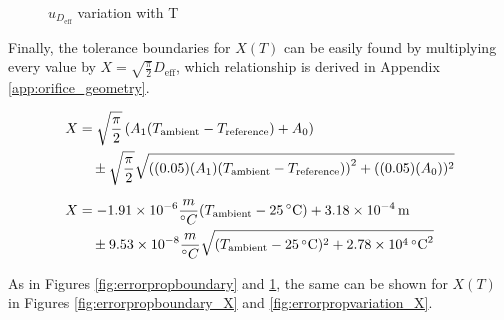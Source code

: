 \documentclass[12pt, letterpaper]{report}%
\newcommand{\degC}{^{\circ}C}    %
\begin{document}
\begin{appendices}
        \begin{figure}[H]
            \centering
            \caption{$u_{D_{\text{eff}}}$ variation with T}
            \label{fig:errorpropvariation}
        \end{figure}

    Finally, the tolerance boundaries for $X(T)$ can be easily found by multiplying every value by $X = \sqrt{\frac{\pi}{2}} D_{\text{eff}}$,
    which relationship is derived in Appendix \ref{app:orifice_geometry}.

        \begin{align}
            X &= \sqrt{\frac{\pi}{2}} \left( A_1(T_{\text{ambient}}-T_{\text{reference}}) + A_0 \right) \notag \\
                &\quad \pm \sqrt{\frac{\pi}{2}} \sqrt{\left( (0.05)(A_1)(T_{\text{ambient}}-T_{\text{reference}}) \right)^2 + ((0.05)(A_0))^2} \label{eq:RR_symb_X}
            \\[6pt]
            X &= \SI{-1.91e-6}{} \frac{m}{\degC} (T_{\text{ambient}} - \SI{25}{\degreeCelsius}) + \SI{3.18e-4}{\meter} \notag \\
                &\quad \pm \SI{9.53e-8}{} \frac{m}{\degC} \sqrt{(T_{\text{ambient}} - \SI{25}{\degreeCelsius})^2 + \SI{2.78e4}{\degreeCelsius\squared}} \label{eq:RR_full_X}
        \end{align}

    As in Figures \ref{fig:errorpropboundary} and \ref{fig:errorpropvariation}, the same can be shown for $X(T)$ in Figures \ref{fig:errorpropboundary_X} and \ref{fig:errorpropvariation_X}.

        \begin{figure}[H]
            \centering
\end{figure}
\end{appendices}
\end{document}

